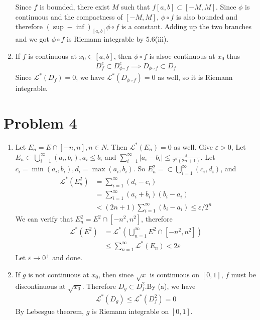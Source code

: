 \documentclass[a4paper]{report}
\def\ve{\varepsilon}
\newcommand{\mcal}[1]{\mathcal{#1}}
\begin{document}
\begin{enumerate}[label = (\alph*)]
Since $f$ is bounded, there exist $M$ such that $f[a, b] \subset [-M, M]$. Since $\phi$ is
continuous and the compactness of $[-M, M]$, $\phi \circ f$ is also bounded and therefore 
${(\sup-\inf)}_{[a,b]} \phi \circ f$ is a constant. Adding up the two branches and we got 
$\phi \circ f$ is Riemann integrable by 5.6(iii).

\item 
If $f$ is continuous at $x_0 \in [a,b]$, then $\phi \circ f$ is alsoe continuous at $x_0$ 
thus 
\begin{align}
    D_f^c \subset D_{\phi\circ f}^c \implies D_{\phi\circ f} \subset D_f
\end{align}
Since $\mcal{L}^*(D_f) = 0$, we have $\mathcal{L}^*(D_{\phi\circ f}) = 0$ as well, so 
it is Riemann integrable.

\end{enumerate}

\section*{Problem 4}
\begin{enumerate}[label = (\alph*)]
\item 
Let $E_n = E \cap [-n, n], n \in N$. Then $\mcal{L}^* (E_n) = 0$ as well. Give $\ve > 0$, Let 
$E_n \subset \bigcup_{i=1}^\infty (a_i, b_i), a_i \le b_i$ and $\sum_{i=1}^\infty |a_i - b_i|
\le \frac{\ve}{2^n(2n+1)}$. Let $c_i = \min(a_i, b_i), d_i = \max(a_i, b_i)$. 
So $E_n^2 =  \subset \bigcup_{i=1}^\infty (c_i, d_i)$, and
\begin{align*}
    \mcal{L}^*(E_n^2) &= 
    \sum_{i=1}^\infty (d_i - c_i)\\ &= \sum_{i=1}^\infty (a_i+b_i)(b_i-a_i) \\
        &< (2n+1)\sum_{i=1}^\infty (b_i-a_i) \le \ve/2^n
\end{align*}
We can verify that $E_n^2 = E^2 \cap [-n^2, n^2]$, therefore
\begin{align*}
    \mcal{L}^*(E^2) &= \mcal{L}^* \left(\bigcup_{n=1}^\infty E^2 \cap [-n^2, n^2]\right) \\
        &\le \sum_{n=1}^\infty \mcal{L}^*(E_n) < 2\ve
\end{align*}
Let $\ve \to 0^+$ and done.

\item 
If $g$ is not continuous at $x_0$, then since $\sqrt{x}$ is continuous on $[0,1]$, $f$ 
must be discontinuous at $\sqrt{x_0}$. Therefore $D_g \subset D_f^2$.By (a), we have 
\begin{align*}
    \mcal{L}^*(D_g) \le \mcal{L}^*(D_f^2) = 0
\end{align*}
By Lebesgue theorem, $g$ is Riemann integrable on $[0,1]$.

\end{enumerate}
\end{document}
